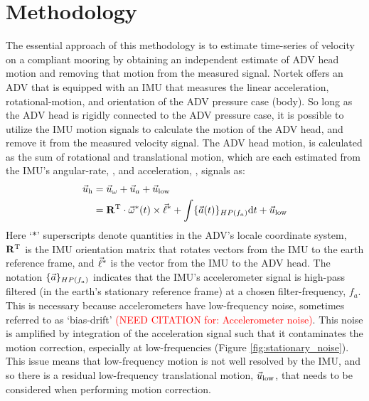 \documentclass[twocol]{ametsoc}
\newcommand{\citeneeded}[1]{\textcolor{red}{(NEED CITATION for: #1)}}
\begin{document}
\section{Methodology}
\label{sec:methods}


The essential approach of this methodology is to estimate time-series of velocity on a compliant mooring by obtaining an independent estimate of ADV head motion and removing that motion from the measured signal. Nortek offers an ADV that is equipped with an IMU that measures the linear acceleration, rotational-motion, and orientation of the ADV pressure case (body). So long as the ADV head is rigidly connected to the ADV pressure case, it is possible to utilize the IMU motion signals to calculate the motion of the ADV head, and remove it from the measured velocity signal.  The ADV head motion, is calculated as the sum of rotational and translational motion, which are each estimated from the IMU's angular-rate, \AngRt, and acceleration, \Accel, signals as:
\begin{align}
  \vec{u}_\mathrm{h} & = \vec{u}_\omega + \vec{u}_a + \vec{u}_\mathrm{low} \\
      & = \mathbf{R}^\mathrm{T} \cdot \vec{\omega}^*(t)\times\vec{\ell}^* + \int \{{\vec{a}}(t)\}_{HP(f_{a})} \mathrm{d}t + \vec{u}_\mathrm{low}
\end{align}
Here `$*$' superscripts denote quantities in the ADV's locale coordinate system, $\mathbf{R}^\mathrm{T}$ is the IMU orientation matrix that rotates vectors from the IMU to the earth reference frame, and $\vec{\ell}^*$ is the vector from the IMU to the ADV head. The notation $\{{\vec{a}}\}_{HP(f_a)}$ indicates that the IMU's accelerometer signal is high-pass filtered (in the earth's stationary reference frame) at a chosen filter-frequency, $f_a$. This is necessary because accelerometers have low-frequency noise, sometimes referred to as `bias-drift' \citeneeded{Accelerometer noise}. This noise is amplified by integration of the acceleration signal such that it contaminates the motion correction, especially at low-frequencies (Figure \ref{fig:stationary_noise}).  This issue means that low-frequency motion is not well resolved by the IMU, and so there is a residual low-frequency translational motion, $\vec{u}_\mathrm{low}$, that needs to be considered when performing motion correction.
\end{document}
